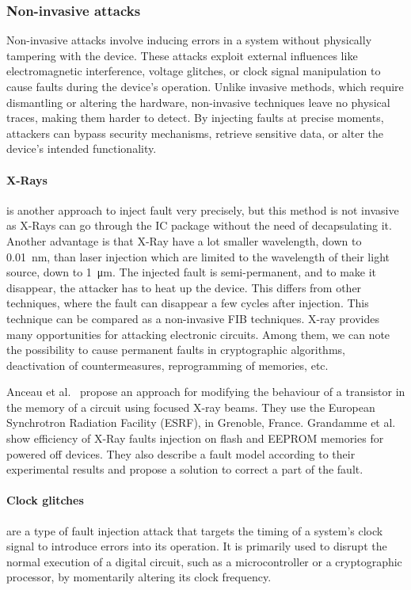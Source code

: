\subsubsection{Non-invasive attacks}
Non-invasive attacks involve inducing errors in a system without physically tampering with the device. These attacks exploit external influences like electromagnetic interference, voltage glitches, or clock signal manipulation to cause faults during the device's operation. Unlike invasive methods, which require dismantling or altering the hardware, non-invasive techniques leave no physical traces, making them harder to detect. By injecting faults at precise moments, attackers can bypass security mechanisms, retrieve sensitive data, or alter the device's intended functionality.

\paragraph{X-Rays} is another approach to inject fault very precisely, but this method is not invasive as X-Rays can go through the IC package without the need of decapsulating it. Another advantage is that X-Ray have a lot smaller wavelength, down to \SI{0.01}{\nano\meter}, than laser injection which are limited to the wavelength of their light source, down to \SI{1}{\micro\meter}.
The injected fault is semi-permanent, and to make it disappear, the attacker has to heat up the device. This differs from other techniques, where the fault can disappear a few cycles after injection.
This technique can be compared as a non-invasive FIB techniques. X-ray provides many opportunities for attacking electronic circuits. Among them, we can note the possibility to cause permanent faults in cryptographic algorithms, deactivation of countermeasures, reprogramming of memories, etc.

Anceau et al.~\cite{ABCMRT-17-ches, BAMCST-23-dft} propose an approach for modifying the behaviour of a transistor in the memory of a circuit using focused X-ray beams. 
They use the European Synchrotron Radiation Facility (ESRF), in Grenoble, France.
Grandamme et al.~\cite{GBD-23-paine} show efficiency of X-Ray faults injection on flash and EEPROM memories for powered off devices. They also describe a fault model according to their experimental results and propose a solution to correct a part of the fault.

\paragraph{Clock glitches} are a type of fault injection attack that targets the timing of a system's clock signal to introduce errors into its operation. It is primarily used to disrupt the normal execution of a digital circuit, such as a microcontroller or a cryptographic processor, by momentarily altering its clock frequency.

